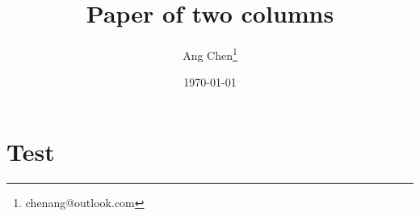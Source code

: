 \documentclass[a4paper,11pt,twocolumn]{article}
\begin{document}
\title{\Large\textbf{Paper of two columns}}
\author{Ang Chen\thanks{chenang@outlook.com}} %
\date{\today} %


\maketitle

\section{Test}

\lipsum[1-2]



\lipsum[3]


\lipsum[4]
\end{document}
